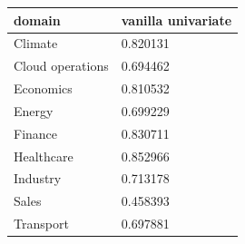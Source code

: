 \begin{tabular}{ll}
\toprule
domain & vanilla univariate \\
\midrule
Climate & 0.820131 \\
Cloud operations & 0.694462 \\
Economics & 0.810532 \\
Energy & 0.699229 \\
Finance & 0.830711 \\
Healthcare & 0.852966 \\
Industry & 0.713178 \\
Sales & 0.458393 \\
Transport & 0.697881 \\
\bottomrule
\end{tabular}
